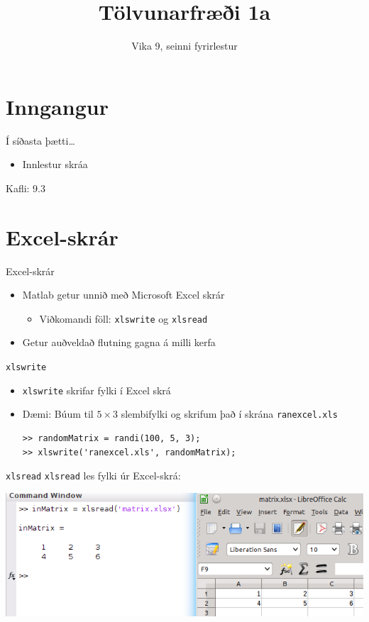 \documentclass{beamer}
\title{Tölvunarfræði 1a}
\subtitle{Vika 9, seinni fyrirlestur}
\begin{document}
\begin{frame}
\titlepage
\end{frame}

\section{Inngangur}

\begin{frame}{Í síðasta þætti\ldots}
\begin{itemize}
 \item Innlestur skráa
\end{itemize}
Kafli: 9.3
\end{frame}

\section{Excel-skrár}

\begin{frame}{Excel-skrár}
\begin{itemize}
 \item Matlab getur unnið með Microsoft Excel skrár
 \begin{itemize}
  \item Viðkomandi föll: \texttt{xlswrite} og \texttt{xlsread}
 \end{itemize}
 \item Getur auðveldað flutning gagna á milli kerfa
\end{itemize}
\end{frame}

\begin{frame}[fragile]{\texttt{xlswrite}}
\begin{itemize}
 \item \texttt{xlswrite} skrifar fylki í Excel skrá
 \item Dæmi: Búum til $5 \times 3$ slembifylki og skrifum það í skrána \texttt{ranexcel.xls}
\begin{verbatim}
>> randomMatrix = randi(100, 5, 3); 
>> xlswrite('ranexcel.xls', randomMatrix); 
\end{verbatim}
\end{itemize}
\end{frame}

\begin{frame}[fragile]{\texttt{xlsread}}
\texttt{xlsread} les fylki úr Excel-skrá:

\includegraphics[width=\textwidth]{../Pics/excel}

\end{frame}
\end{document}
